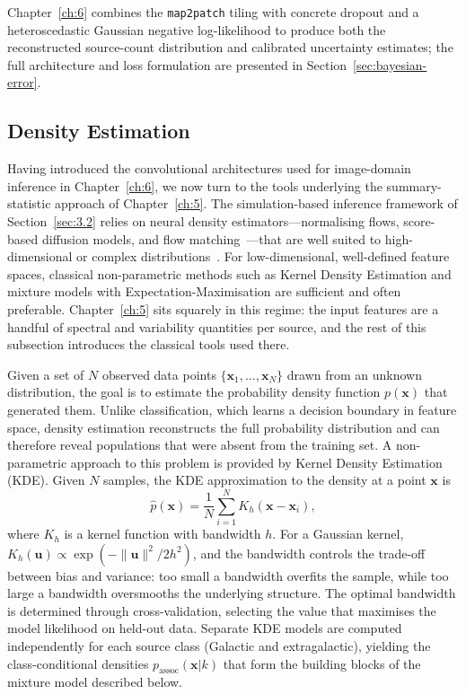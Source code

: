 Chapter~\ref{ch:6} combines the \texttt{map2patch} tiling with concrete dropout and a heteroscedastic Gaussian negative log-likelihood to produce both the reconstructed source-count distribution and calibrated uncertainty estimates; the full architecture and loss formulation are presented in Section~\ref{sec:bayesian-error}.

\subsection{Density Estimation}
\label{sec:3.3.4}

Having introduced the convolutional architectures used for image-domain inference in Chapter~\ref{ch:6}, we now turn to the tools underlying the summary-statistic approach of Chapter~\ref{ch:5}.
The simulation-based inference framework of Section~\ref{sec:3.2} relies on neural density estimators---normalising flows, score-based diffusion models, and flow matching~\cite{Papamakarios:2021,Song:2021zrs,Lipman:2023hef}---that are well suited to high-dimensional or complex distributions~\cite{Cranmer:2020}.
For low-dimensional, well-defined feature spaces, classical non-parametric methods such as Kernel Density Estimation and mixture models with Expectation-Maximisation are sufficient and often preferable.
Chapter~\ref{ch:5} sits squarely in this regime: the input features are a handful of spectral and variability quantities per source, and the rest of this subsection introduces the classical tools used there.

Given a set of $N$ observed data points $\{\mathbf{x}_1, \ldots, \mathbf{x}_N\}$ drawn from an unknown distribution, the goal is to estimate the probability density function $p(\mathbf{x})$ that generated them.
Unlike classification, which learns a decision boundary in feature space, density estimation reconstructs the full probability distribution and can therefore reveal populations that were absent from the training set.
A non-parametric approach to this problem is provided by Kernel Density Estimation (KDE).
Given $N$ samples, the KDE approximation to the density at a point $\mathbf{x}$ is
\begin{equation}
	\hat{p}(\mathbf{x}) = \frac{1}{N} \sum_{i=1}^{N} K_h(\mathbf{x} - \mathbf{x}_i),
	\label{eq:kde}
\end{equation}
where $K_h$ is a kernel function with bandwidth $h$.
For a Gaussian kernel, $K_h(\mathbf{u}) \propto \exp(-\|\mathbf{u}\|^2 / 2h^2)$, and the bandwidth controls the trade-off between bias and variance: too small a bandwidth overfits the sample, while too large a bandwidth oversmooths the underlying structure.
The optimal bandwidth is determined through cross-validation, selecting the value that maximises the model likelihood on held-out data.
Separate KDE models are computed independently for each source class (Galactic and extragalactic), yielding the class-conditional densities $p_\mathrm{assoc}(\mathbf{x}|k)$ that form the building blocks of the mixture model described below.

